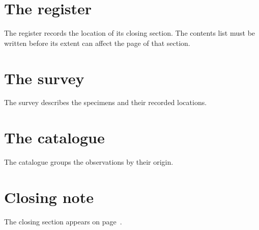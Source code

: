 \documentclass{article}
\begin{document}
\tableofcontents
\section{The register}
The register records the location of its closing section. The contents list
must be written before its extent can affect the page of that section.
\section{The survey}
The survey describes the specimens and their recorded locations.
\section{The catalogue}
The catalogue groups the observations by their origin.
\section{Closing note}\label{sec:closing}
The closing section appears on page~\pageref{sec:closing}.
\end{document}
